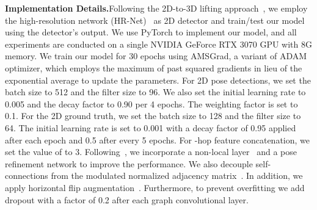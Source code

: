 \documentclass[10pt,journal]{IEEEtran}
\begin{document}
\medskip\noindent\textbf{Implementation Details.}\quad Following the 2D-to-3D lifting approach~\cite{li2022mhformer,YujunCai:19,pavllo20193d,zou2021modulated}, we employ the high-resolution network (HR-Net)~\cite{sun2019deep} as 2D detector and train/test our model using the detector's output. We use PyTorch to implement our model, and all experiments are conducted on a single NVIDIA GeForce RTX 3070 GPU with 8G memory. We train our model for 30 epochs using AMSGrad, a variant of ADAM optimizer, which employs the maximum of past squared gradients in lieu of the exponential average to update the parameters. For 2D pose detections, we set the batch size to 512 and the filter size to 96. We also set the initial learning rate to 0.005 and the decay factor to 0.90 per 4 epochs. The weighting factor  is set to 0.1. For the 2D ground truth, we set the batch size to 128 and the filter size to 64. The initial learning rate is set to 0.001 with a decay factor of 0.95 applied after each epoch and 0.5 after every 5 epochs. For -hop feature concatenation, we set the value of  to 3. Following~\cite{YujunCai:19}, we incorporate a non-local layer~\cite{wang2018non} and a pose refinement network to improve the performance. We also decouple self-connections from the modulated normalized adjacency matrix~\cite{liu2020comprehensive}. In addition, we apply horizontal flip augmentation~\cite{zou2021modulated, li2022mhformer}. Furthermore, to prevent overfitting we add dropout with a factor of 0.2 after each graph convolutional layer.
	
\end{document}
